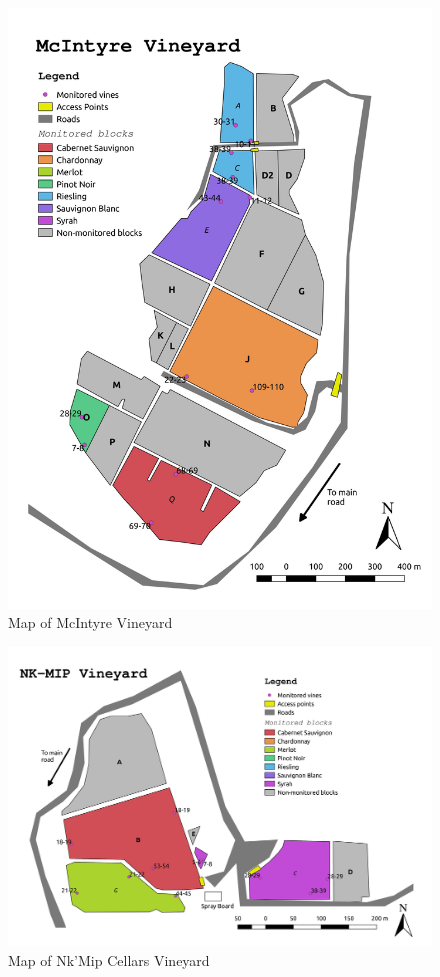 \documentclass[11pt,letter]{article}
\begin{document}
\begin{figure} [h]
   \includegraphics[width = \linewidth]{MC_Map.jpg}
  \caption{Map of McIntyre Vineyard}
  \label{fig:MCmap}
\end{figure}

\begin{figure} [h]
   \includegraphics[width = \linewidth]{NK_Map.jpg}
  \caption{Map of Nk'Mip Cellars Vineyard}
  \label{fig:NKmap}
\end{figure}
\end{document}
